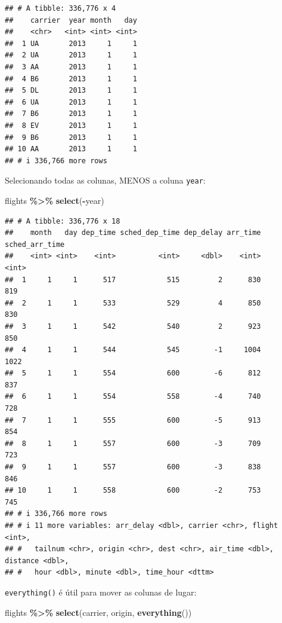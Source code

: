 \documentclass[
]{book}
\newenvironment{Shaded}{\begin{snugshade}}{\end{snugshade}}
\newcommand{\FunctionTok}[1]{\textcolor[rgb]{0.13,0.29,0.53}{\textbf{#1}}}
\newcommand{\NormalTok}[1]{#1}
\newcommand{\SpecialCharTok}[1]{\textcolor[rgb]{0.81,0.36,0.00}{\textbf{#1}}}
\begin{document}
\begin{verbatim}
## # A tibble: 336,776 x 4
##    carrier  year month   day
##    <chr>   <int> <int> <int>
##  1 UA       2013     1     1
##  2 UA       2013     1     1
##  3 AA       2013     1     1
##  4 B6       2013     1     1
##  5 DL       2013     1     1
##  6 UA       2013     1     1
##  7 B6       2013     1     1
##  8 EV       2013     1     1
##  9 B6       2013     1     1
## 10 AA       2013     1     1
## # i 336,766 more rows
\end{verbatim}

Selecionando todas as colunas, MENOS a coluna \texttt{year}:

\begin{Shaded}
\begin{Highlighting}[]
\NormalTok{flights }\SpecialCharTok{\%\textgreater{}\%} \FunctionTok{select}\NormalTok{(}\SpecialCharTok{{-}}\NormalTok{year)}
\end{Highlighting}
\end{Shaded}

\begin{verbatim}
## # A tibble: 336,776 x 18
##    month   day dep_time sched_dep_time dep_delay arr_time sched_arr_time
##    <int> <int>    <int>          <int>     <dbl>    <int>          <int>
##  1     1     1      517            515         2      830            819
##  2     1     1      533            529         4      850            830
##  3     1     1      542            540         2      923            850
##  4     1     1      544            545        -1     1004           1022
##  5     1     1      554            600        -6      812            837
##  6     1     1      554            558        -4      740            728
##  7     1     1      555            600        -5      913            854
##  8     1     1      557            600        -3      709            723
##  9     1     1      557            600        -3      838            846
## 10     1     1      558            600        -2      753            745
## # i 336,766 more rows
## # i 11 more variables: arr_delay <dbl>, carrier <chr>, flight <int>,
## #   tailnum <chr>, origin <chr>, dest <chr>, air_time <dbl>, distance <dbl>,
## #   hour <dbl>, minute <dbl>, time_hour <dttm>
\end{verbatim}

\texttt{everything()} é útil para mover as colunas de lugar:

\begin{Shaded}
\begin{Highlighting}[]
\NormalTok{flights }\SpecialCharTok{\%\textgreater{}\%} \FunctionTok{select}\NormalTok{(carrier, origin, }\FunctionTok{everything}\NormalTok{())}
\end{Highlighting}
\end{Shaded}
\end{document}
